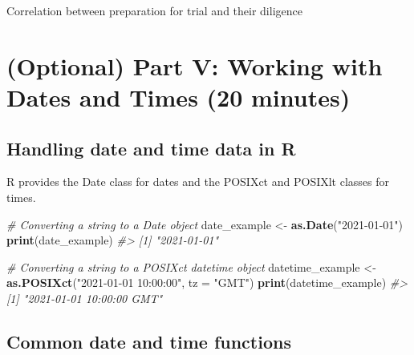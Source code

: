 \documentclass[
]{book}
\newenvironment{Shaded}{\begin{snugshade}}{\end{snugshade}}
\newcommand{\AttributeTok}[1]{\textcolor[rgb]{0.13,0.29,0.53}{#1}}
\newcommand{\CommentTok}[1]{\textcolor[rgb]{0.56,0.35,0.01}{\textit{#1}}}
\newcommand{\FunctionTok}[1]{\textcolor[rgb]{0.13,0.29,0.53}{\textbf{#1}}}
\newcommand{\NormalTok}[1]{#1}
\newcommand{\OtherTok}[1]{\textcolor[rgb]{0.56,0.35,0.01}{#1}}
\newcommand{\StringTok}[1]{\textcolor[rgb]{0.31,0.60,0.02}{#1}}
\begin{document}
Correlation between preparation for trial and their diligence

\chapter*{(Optional) Part V: Working with Dates and Times (20 minutes)}\label{optional-part-v-working-with-dates-and-times-20-minutes}

\section*{Handling date and time data in R}\label{handling-date-and-time-data-in-r}

R provides the Date class for dates and the POSIXct and POSIXlt classes for times.

\begin{Shaded}
\begin{Highlighting}[]
\CommentTok{\# Converting a string to a Date object}
\NormalTok{date\_example }\OtherTok{\textless{}{-}} \FunctionTok{as.Date}\NormalTok{(}\StringTok{"2021{-}01{-}01"}\NormalTok{)}
\FunctionTok{print}\NormalTok{(date\_example)}
\CommentTok{\#\textgreater{} [1] "2021{-}01{-}01"}

\CommentTok{\# Converting a string to a POSIXct datetime object}
\NormalTok{datetime\_example }\OtherTok{\textless{}{-}} \FunctionTok{as.POSIXct}\NormalTok{(}\StringTok{"2021{-}01{-}01 10:00:00"}\NormalTok{, }\AttributeTok{tz =} \StringTok{"GMT"}\NormalTok{)}
\FunctionTok{print}\NormalTok{(datetime\_example)}
\CommentTok{\#\textgreater{} [1] "2021{-}01{-}01 10:00:00 GMT"}
\end{Highlighting}
\end{Shaded}

\section*{Common date and time functions}\label{common-date-and-time-functions}
\end{document}
